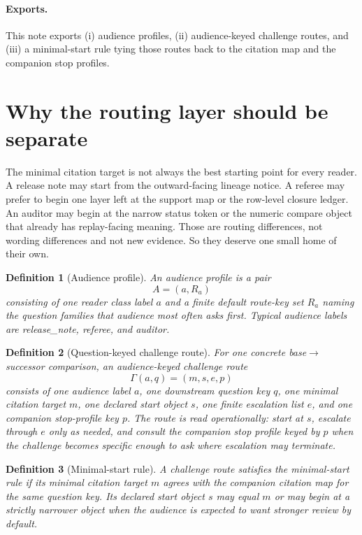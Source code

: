 \documentclass[11pt]{article}
\newtheorem{definition}{Definition}
\begin{document}
\paragraph{Exports.}
This note exports (i) audience profiles, (ii) audience-keyed challenge routes, and (iii) a minimal-start rule tying those routes back to the citation map and the companion stop profiles.

\section{Why the routing layer should be separate}
The minimal citation target is not always the best starting point for every reader.
A release note may start from the outward-facing lineage notice.
A referee may prefer to begin one layer left at the support map or the row-level closure ledger.
An auditor may begin at the narrow status token or the numeric compare object that already has replay-facing meaning.
Those are routing differences, not wording differences and not new evidence.
So they deserve one small home of their own.

\begin{definition}[Audience profile]
An \emph{audience profile} is a pair
\[
A=(a,R_a)
\]
consisting of one reader class label $a$ and a finite default route-key set $R_a$ naming the question families that audience most often asks first.
Typical audience labels are \textsf{release\_note}, \textsf{referee}, and \textsf{auditor}.
\end{definition}

\begin{definition}[Question-keyed challenge route]
For one concrete base$\to$successor comparison, an \emph{audience-keyed challenge route}
\[
\Gamma(a,q)=(m,s,e,p)
\]
consists of one audience label $a$, one downstream question key $q$, one minimal citation target $m$, one declared start object $s$, one finite escalation list $e$, and one companion stop-profile key $p$.
The route is read operationally: start at $s$, escalate through $e$ only as needed, and consult the companion stop profile keyed by $p$ when the challenge becomes specific enough to ask where escalation may terminate.
\end{definition}

\begin{definition}[Minimal-start rule]
A challenge route satisfies the \emph{minimal-start rule} if its minimal citation target $m$ agrees with the companion citation map for the same question key.
Its declared start object $s$ may equal $m$ or may begin at a strictly narrower object when the audience is expected to want stronger review by default.
\end{definition}
\end{document}
